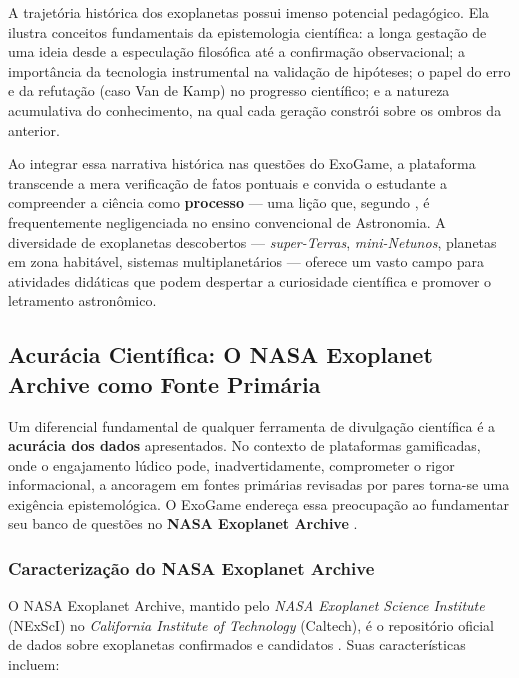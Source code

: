 \documentclass[
	12pt,
	openany,
	oneside,
	a4paper,
	english,
	brazil
]{abntex2}
\begin{document}
A trajetória histórica dos exoplanetas possui imenso potencial pedagógico. Ela ilustra conceitos fundamentais da epistemologia científica: a longa gestação de uma ideia desde a especulação filosófica até a confirmação observacional; a importância da tecnologia instrumental na validação de hipóteses; o papel do erro e da refutação (caso Van de Kamp) no progresso científico; e a natureza acumulativa do conhecimento, na qual cada geração constrói sobre os ombros da anterior.

Ao integrar essa narrativa histórica nas questões do ExoGame, a plataforma transcende a mera verificação de fatos pontuais e convida o estudante a compreender a ciência como \textbf{processo} --- uma lição que, segundo , é frequentemente negligenciada no ensino convencional de Astronomia. A diversidade de exoplanetas descobertos --- \textit{super-Terras}, \textit{mini-Netunos}, planetas em zona habitável, sistemas multiplanetários --- oferece um vasto campo para atividades didáticas que podem despertar a curiosidade científica e promover o letramento astronômico.

\subsection{Acurácia Científica: O NASA Exoplanet Archive como Fonte Primária}\label{sec:acuracia}

Um diferencial fundamental de qualquer ferramenta de divulgação científica é a \textbf{acurácia dos dados} apresentados. No contexto de plataformas gamificadas, onde o engajamento lúdico pode, inadvertidamente, comprometer o rigor informacional, a ancoragem em fontes primárias revisadas por pares torna-se uma exigência epistemológica. O ExoGame endereça essa preocupação ao fundamentar seu banco de questões no \textbf{NASA Exoplanet Archive} \cite{nasaexoplanet2024, akeson2013}.

\subsubsection{Caracterização do NASA Exoplanet Archive}

O NASA Exoplanet Archive, mantido pelo \textit{NASA Exoplanet Science Institute} (NExScI) no \textit{California Institute of Technology} (Caltech), é o repositório oficial de dados sobre exoplanetas confirmados e candidatos \cite{akeson2013}. Suas características incluem:
\end{document}
